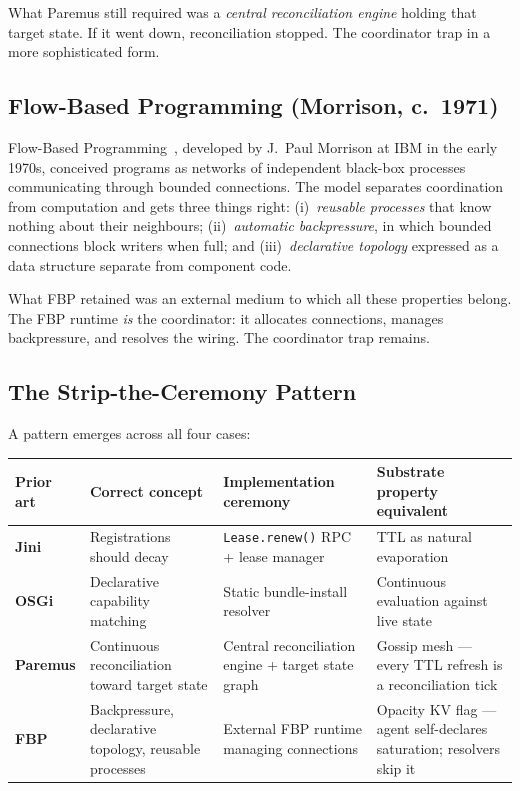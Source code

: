 \documentclass[11pt]{article}
\begin{document}
What Paremus still required was a \emph{central reconciliation engine} holding
that target state. If it went down, reconciliation stopped. The coordinator trap
in a more sophisticated form.

\subsection{Flow-Based Programming (Morrison, c.~1971)}

Flow-Based Programming~\cite{fbp}, developed by J.~Paul Morrison at IBM in the
early 1970s, conceived programs as networks of independent black-box processes
communicating through bounded connections. The model separates coordination from
computation and gets three things right: (i)~\emph{reusable processes} that know
nothing about their neighbours; (ii)~\emph{automatic backpressure}, in which
bounded connections block writers when full; and (iii)~\emph{declarative topology}
expressed as a data structure separate from component code.

What FBP retained was an external medium to which all these properties belong. The
FBP runtime \emph{is} the coordinator: it allocates connections, manages
backpressure, and resolves the wiring. The coordinator trap remains.

\subsection{The Strip-the-Ceremony Pattern}

A pattern emerges across all four cases:

\begin{center}
\renewcommand{\arraystretch}{1.25}
\begin{tabularx}{\textwidth}{>{\bfseries}lXXX}
\toprule
Prior art & Correct concept & Implementation ceremony & Substrate property equivalent \\
\midrule
Jini & Registrations should decay & \texttt{Lease.renew()} RPC + lease manager & TTL as natural evaporation \\
OSGi & Declarative capability matching & Static bundle-install resolver & Continuous evaluation against live state \\
Paremus & Continuous reconciliation toward target state & Central reconciliation engine + target state graph & Gossip mesh --- every TTL refresh is a reconciliation tick \\
FBP & Backpressure, declarative topology, reusable processes & External FBP runtime managing connections & Opacity KV flag --- agent self-declares saturation; resolvers skip it \\
\bottomrule
\end{tabularx}
\end{center}
\end{document}

